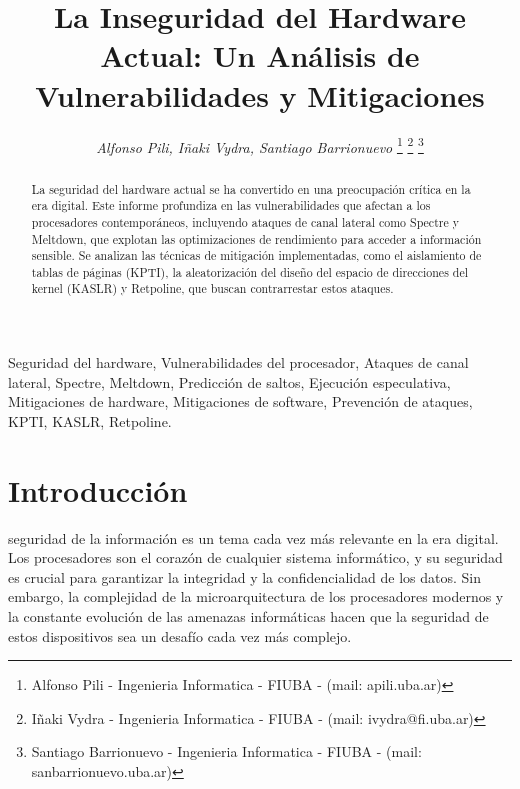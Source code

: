 \documentclass[lettersize,compsoc]{IEEEtran}
\begin{document}
\title{La Inseguridad del Hardware Actual: Un Análisis de Vulnerabilidades y Mitigaciones }  

\author{
\textit{Alfonso Pili, Iñaki Vydra, Santiago Barrionuevo}
\thanks{Alfonso Pili - Ingenieria Informatica - FIUBA - (mail: apili.uba.ar)}
\thanks{Iñaki Vydra - Ingenieria Informatica - FIUBA - (mail: ivydra@fi.uba.ar)}
\thanks{Santiago Barrionuevo - Ingenieria Informatica - FIUBA - (mail: sanbarrionuevo.uba.ar)}
}

\maketitle

\begin{abstract} 
  La seguridad del hardware actual se ha convertido en una preocupación crítica en la era digital. Este informe profundiza en las vulnerabilidades que afectan a los procesadores contemporáneos, incluyendo ataques de canal lateral como Spectre y Meltdown, que explotan las optimizaciones de rendimiento para acceder a información sensible. Se analizan las técnicas de mitigación implementadas, como el aislamiento de tablas de páginas (KPTI), la aleatorización del diseño del espacio de direcciones del kernel (KASLR) y Retpoline, que buscan contrarrestar estos ataques.
\end{abstract}

\begin{IEEEkeywords} 
  Seguridad del hardware, Vulnerabilidades del procesador, Ataques de canal lateral, Spectre, Meltdown, Predicción de saltos, Ejecución especulativa, Mitigaciones de hardware, Mitigaciones de software, Prevención de ataques, KPTI, KASLR, Retpoline.
\end{IEEEkeywords}

\section{Introducción}
 seguridad de la información es un tema cada vez más relevante en la era digital. Los procesadores son el corazón de cualquier sistema informático, y su seguridad es crucial para garantizar la integridad y la confidencialidad de los datos. Sin embargo, la complejidad de la microarquitectura de los procesadores modernos y la constante evolución de las amenazas informáticas hacen que la seguridad de estos dispositivos sea un desafío cada vez más complejo.
\end{document}
